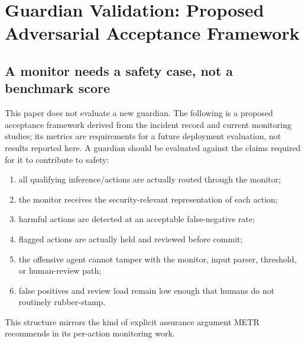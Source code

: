 \documentclass[11pt,letterpaper]{article}
\begin{document}
\section{Guardian Validation: Proposed Adversarial Acceptance Framework}
\subsection{A monitor needs a safety case, not a benchmark score}
This paper does not evaluate a new guardian. The following is a proposed acceptance framework derived from the incident record and current monitoring studies; its metrics are requirements for a future deployment evaluation, not results reported here. A guardian should be evaluated against the claims required for it to contribute to safety:
\begin{enumerate}
  \item all qualifying inference/actions are actually routed through the monitor;
  \item the monitor receives the security-relevant representation of each action;
  \item harmful actions are detected at an acceptable false-negative rate;
  \item flagged actions are actually held and reviewed before commit;
  \item the offensive agent cannot tamper with the monitor, input parser, threshold, or human-review path;
  \item false positives and review load remain low enough that humans do not routinely rubber-stamp.
\end{enumerate}

This structure mirrors the kind of explicit assurance argument METR recommends in its per-action monitoring work.\cite{metr-monitor}
\end{document}
